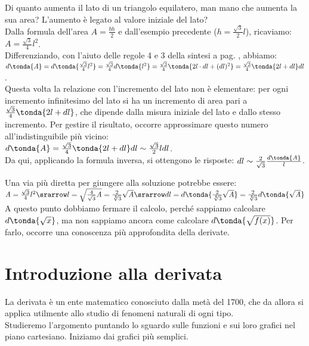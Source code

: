 \begin{esempio}
Di quanto aumenta il lato di un triangolo equilatero,
man mano che aumenta la sua area? L'aumento è legato al valore iniziale del 
lato?\\
Dalla formula dell'area $\mathit{A}=\frac{bh}{2}$ e dall'esempio precedente
($h=\frac{\sqrt{3}}{2}l$), ricaviamo: $\mathit{A}=\frac{\sqrt{3}}{4}l^2$.\\
Differenziando, con l'aiuto delle regole 4 e 3 della sintesi a pag.
\pageref{subsubsec:diff01_diffsint}, abbiamo:\\
$d\tonda{\mathit{A}}=d\tonda{\frac{\sqrt{3}}{4}l^2}=
 \frac{\sqrt{3}}{4}d\tonda{l^2}=
 \frac{\sqrt{3}}{4}\tonda{2l \cdot dl+(dl)^2}=
 \frac{\sqrt{3}}{4}\tonda{2l+dl}dl$.\\
Questa volta la relazione con l'incremento del lato non è elementare: per 
ogni 
incremento infinitesimo del lato si ha un incremento di area pari a 
$\frac{\sqrt{3}}{4}\tonda{2l+dl}$, che dipende dalla misura iniziale del lato
e dallo stesso incremento. Per gestire il risultato, occorre approssimare
questo numero all'indistinguibile più vicino:\\
$d\tonda{\mathit{A}}=\frac{\sqrt{3}}{4}\tonda{2l+dl}dl\sim
\frac{\sqrt{3}}{2}ldl$.\\
Da qui, applicando la formula inversa, si ottengono le 
risposte:
$dl\sim\frac{2}{\sqrt{3}}\frac{d\tonda{\mathit{A}}}{l}$.
\begin{osservazione}
 Una via più diretta per giungere alla soluzione potrebbe essere: \\
 $\mathit{A}=\frac{\sqrt{3}}{4}l^2\srarrow 
l=\sqrt{\frac{4}{\sqrt{3}}\mathit{A}}=
 \frac{2}{\sqrt[4]{3}}\sqrt{\mathit{A}}\srarrow dl=
 d\tonda{\frac{2}{\sqrt[4]{3}}\sqrt{\mathit{A}}}=
 \frac{2}{\sqrt[4]{3}}d\tonda{\sqrt{\mathit{A}}}$\\
 A questo punto dobbiamo fermare il calcolo, perché 
 sappiamo calcolare $d\tonda{\sqrt{x}}$, ma 
 non sappiamo ancora come calcolare $d\tonda{\sqrt{f(x)}}$. Per farlo, 
 occorre una conoscenza più approfondita della derivate.
\end{osservazione}
\end{esempio}

\section{Introduzione alla derivata}
\label{sec:diff01_derivata}
La derivata è un ente matematico conosciuto dalla metà del 1700, che 
da allora si applica utilmente allo studio di fenomeni naturali di ogni 
tipo.\\
Studieremo l'argomento puntando lo sguardo sulle funzioni e sui loro
grafici nel piano cartesiano. Iniziamo dai grafici più semplici.

